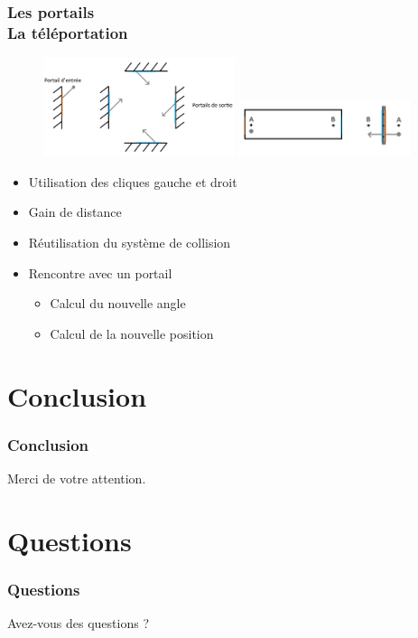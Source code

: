 \documentclass{beamer}
\begin{document}
\begin{frame}
    \frametitle{Les portails \\
                \small La téléportation}
    \begin{figure}
        \includegraphics[width=0.5\textwidth]{images/portal2.png}
		\includegraphics[width=0.45\textwidth]{images/portal3.png}
	\end{figure}
    \begin{block}{}
        \begin{itemize}
            \item Utilisation des cliques gauche et droit
            \item Gain de distance
        \end{itemize}
    \end{block}
    \begin{block}{}
        \begin{itemize}
            \item Réutilisation du système de collision
            \item Rencontre avec un portail
            \begin{itemize}
                \item Calcul du nouvelle angle
                \item Calcul de la nouvelle position
            \end{itemize}
        \end{itemize}
    \end{block}
\end{frame}

\section{Conclusion}

\begin{frame}
    \frametitle{Conclusion}
    \begin{block}{}
        \centering
        Merci de votre attention.
    \end{block}
\end{frame}

\section*{Questions}

\begin{frame}
    \frametitle{Questions}
    \begin{block}{}
        \centering
        Avez-vous des questions ?
    \end{block}
\end{frame}
\end{document}
